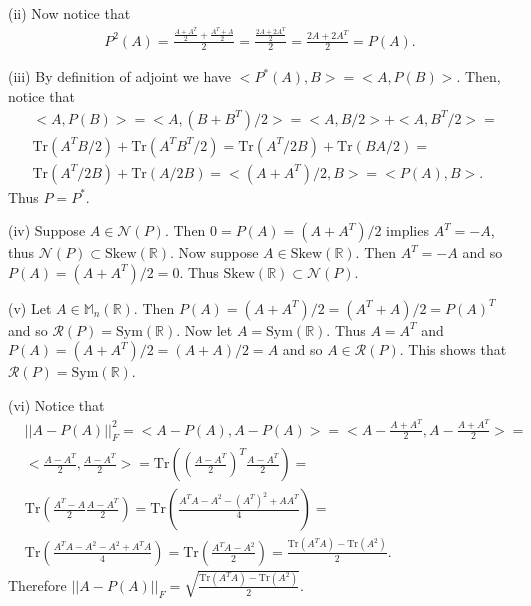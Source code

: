 \documentclass[letterpaper,12pt]{article}
\theoremstyle{definition}
\begin{document}
\begin{spacing}{1.3}{}
	(ii)
	Now notice that
	\begin{align*}
	P^2(A)=\frac{\frac{A+A^T}{2}+\frac{A^T+A}{2}}{2}=
	\frac{\frac{2A+2A^T}{2}}{2}=\frac{2A+2A^T}{2}=P(A).
	\end{align*}
	
	(iii)
	By definition of adjoint we have $<P^*(A),B>=<A,P(B)>$.
	Then, notice that
	\begin{align*}
	&<A,P(B)>=<A,(B+B^T)/2>=
	<A,B/2>+<A,B^T/2>=\\
	&\text{Tr}(A^TB/2)+\text{Tr}(A^TB^T/2)=
	\text{Tr}(A^T/2B)+\text{Tr}(BA/2)=\\
	&\text{Tr}(A^T/2B)+\text{Tr}(A/2B)=
	<(A+A^T)/2,B>=<P(A),B>.
	\end{align*}
	Thus $P=P^*$.
	
	(iv)
	Suppose $A\in\mathcal N(P)$.
	Then $0=P(A)=(A+A^T)/2$ implies $A^T=-A$, thus $\mathcal N(P)\subset\text{Skew}(\mathbb R)$.
	Now suppose $A\in\text{Skew}(\mathbb R)$.
	Then $A^T=-A$ and so $P(A)=(A+A^T)/2=0$. Thus $\text{Skew}(\mathbb R)\subset\mathcal N(P)$.
	
	(v)
	Let $A\in\mathbb M_n(\mathbb R)$.
	Then $P(A)=(A+A^T)/2=(A^T+A)/2=P(A)^T$ and so $\mathcal R(P)=\text{Sym}(\mathbb R)$.
	Now let $A=\text{Sym}(\mathbb R)$.
	Thus $A=A^T$ and $P(A)=(A+A^T)/2=(A+A)/2=A$ and so $A\in\mathcal R(P)$.
	This shows that $\mathcal R(P)=\text{Sym}(\mathbb R)$.
	
	(vi)
	Notice that
	\begin{align*}
	&||A - P(A)||_F^2 = <A - P(A), A - P(A)> =
	<A - \frac{A + A^T}{2}, A - \frac{A + A^T}{2}> =\\
	&<\frac{A - A^T}{2}, \frac{A - A^T}{2}> =
	\text{Tr}\left(\left(\frac{A - A^T}{2}\right)^T\frac{A - A^T}{2}\right)=\\
	&\text{Tr}\left(\frac{A^T - A}{2}\frac{A - A^T}{2}\right) =
	\text{Tr}\left(\frac{A^TA - A^2 - (A^T)^2 + AA^T}{4}\right) =\\
	&\text{Tr}\left(\frac{A^TA - A^2 - A^2 + A^TA}{4}\right) =
	\text{Tr}\left(\frac{A^TA - A^2}{2}\right) =
	\frac{\text{Tr}(A^TA) - \text{Tr}(A^2)}{2}.
	\end{align*}
	Therefore $||A - P(A)||_F = \sqrt{\frac{\text{Tr}(A^TA) - \text{Tr}(A^2)}{2}}$. \\\\
	

\end{spacing}
\end{document}
